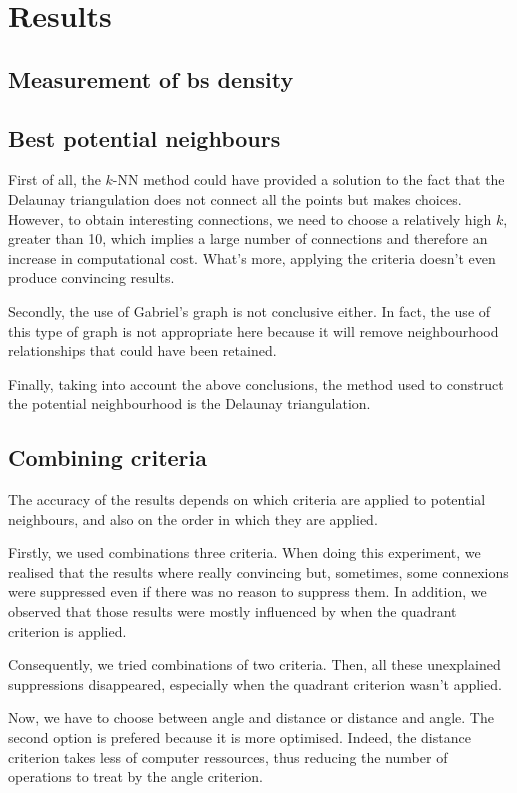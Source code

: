 \documentclass[lettersize,journal,english]{IEEEtran}
\begin{document}
\section{Results\label{sec:res}}
    \subsection{Measurement of \acrshort{bs} density}

    \subsection{Best potential neighbours}
        First of all, the $k$-NN method could have provided a solution to the fact that the Delaunay triangulation does not connect all the points but makes choices. However, to obtain interesting connections, we need to choose a relatively high $k$, greater than 10, which implies a large number of connections and therefore an increase in   computational cost. What's more, applying the criteria doesn't even produce convincing results.
        
        Secondly, the use of Gabriel's graph is not conclusive either. In fact, the use of this type of graph is not appropriate here because it will remove neighbourhood relationships that could have been retained.

        Finally, taking into account the above conclusions, the method used to construct the potential neighbourhood is the Delaunay triangulation.
        
    \subsection{Combining criteria}
        The accuracy of the results depends on which criteria are applied to potential neighbours, and also on the order in which they are applied.

        Firstly, we used combinations three criteria. When doing this experiment, we realised that the results where really convincing but, sometimes, some connexions were suppressed even if there was no reason to suppress them. In addition, we observed that those results were mostly influenced by when the quadrant criterion is applied.

        Consequently, we tried combinations of two criteria. Then, all these unexplained suppressions disappeared, especially when the quadrant criterion wasn't applied.

        Now, we have to choose between angle and distance or distance and angle. The second option is prefered because it is more optimised. Indeed, the distance criterion takes less of computer ressources, thus reducing the number of operations to treat by the angle criterion.
\end{document}
